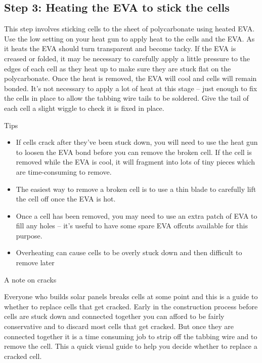 \documentclass{article}
\theoremstyle{definition}
\theoremstyle{definition}
\theoremstyle{remark}
\begin{document}

  {\color{blue}\subsection{Step 3: Heating the EVA to stick the cells}} %
  \label{sub:step_3_heating_the_eva_to_stick_the_cells}

    This step involves sticking cells to the sheet of polycarbonate using heated EVA. Use the low setting on your heat gun to apply heat to the cells and the EVA. As it heats the EVA should turn transparent and become tacky. If the EVA is creased or folded, it may be necessary to carefully apply a little pressure to the edges of each cell as they heat up to make sure they are stuck flat on the polycarbonate. Once the heat is removed, the EVA will cool and cells will remain bonded. It's not necessary to apply a lot of heat at this stage – just enough to fix the cells in place to allow the tabbing wire tails to be soldered. Give the tail of each cell a slight wiggle to check it is fixed in place.

    Tips

    \begin{itemize}
      \item If cells crack after they've been stuck down, you will need to use the heat gun to loosen the EVA bond before you can remove the broken cell. If the cell is removed while the EVA is cool, it will fragment into lots of tiny pieces which are time-consuming to remove. 
      \item The easiest way to remove a broken cell is to use a thin blade to carefully lift the cell off once the EVA is hot.  
      \item Once a cell has been removed, you may need to use an extra patch of EVA to fill any holes – it's useful to have some spare EVA offcuts available for this purpose.
      \item Overheating can cause cells to be overly stuck down and then difficult to remove later
    \end{itemize}

    A note on cracks

    Everyone who builds solar panels breaks cells at some point and this is a guide to whether to replace cells that get cracked. Early in the construction process before cells are stuck down and connected together you can afford to be fairly conservative and to discard most cells that get cracked. But once they are connected together it is a time consuming job to strip off the tabbing wire and to remove the cell. This a quick visual guide to help you decide whether to replace a cracked cell.
\end{document}

